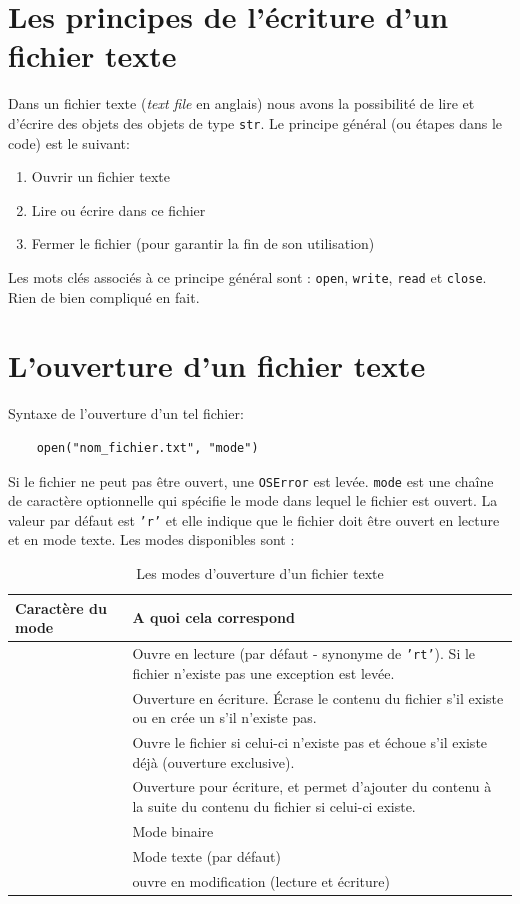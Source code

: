 \documentclass[a4paper,11pt]{book}
\begin{document}
\section{Les principes de l'écriture d'un fichier texte}
Dans un fichier texte (\textit{text file} en anglais) nous avons la possibilité de lire et d'écrire des objets des objets de type \texttt{str}.
Le principe général (ou étapes dans le code) est le suivant:
\begin{enumerate}
	\item Ouvrir un fichier texte
	\item Lire ou écrire dans ce fichier
	\item Fermer le fichier (pour garantir la fin de son utilisation)
\end{enumerate}
\medskip

Les mots clés associés à ce principe général sont : \texttt{open}, \texttt{write}, \texttt{read} et \texttt{close}. Rien de bien compliqué en fait.
\medskip

\section{L'ouverture d'un fichier texte}
Syntaxe de l'ouverture d'un tel fichier:
\begin{verbatim}
    open("nom_fichier.txt", "mode")
\end{verbatim}
\medskip

Si le fichier ne peut pas être ouvert, une \texttt{OSError} est levée. \texttt{mode} est une chaîne de caractère optionnelle qui spécifie le mode dans lequel le fichier est ouvert. La valeur par défaut est \texttt{'r'} et elle indique que le fichier doit être ouvert en lecture et en mode texte. Les modes disponibles sont :
\medskip

\begin{table}[h]
\centering
\begin{tabular}{|p{4cm}|p{9cm}|}
\hline
\textbf{Caractère du mode} & \textbf{A quoi cela correspond} \\
\hline
\centering{\texttt{'r'}} & Ouvre en lecture (par défaut - synonyme de \texttt{'rt'}). Si le fichier n'existe pas une exception est levée. \\
\hline
\centering{\texttt{'w'}} & Ouverture en écriture. Écrase le contenu du fichier s'il existe ou en crée un s'il n'existe pas. \\
\hline
\centering{\texttt{'x'}} & Ouvre le fichier si celui-ci n'existe pas et échoue s'il existe déjà (ouverture exclusive). \\
\hline
\centering{\texttt{'a'}} & Ouverture pour écriture, et permet d'ajouter du contenu à la suite du contenu du fichier si celui-ci existe. \\
\hline
\centering{\texttt{'b'}} & Mode binaire \\
\hline
\centering{\texttt{'t'}} & Mode texte (par défaut) \\
\hline
\centering{\texttt{'+'}} & ouvre en modification (lecture et écriture) \\
\hline 
\end{tabular}
\caption{Les modes d'ouverture d'un fichier texte}
\end{table}
\medskip
\end{document}
